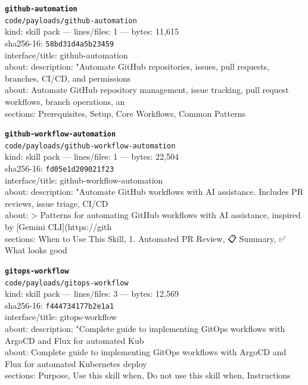 \noindent\textbf{\texttt{github-automation}}\\
\texttt{code/payloads/github-automation}\\
kind: skill pack --- lines/files: 1 --- bytes: 11,615\\
sha256-16: \texttt{58bd31d4a5b23459}\\
interface/title: github-automation\\
about: description: "Automate GitHub repositories, issues, pull requests, branches, CI/CD, and permissions \\
about: Automate GitHub repository management, issue tracking, pull request workflows, branch operations, an\\
sections: Prerequisites, Setup, Core Workflows, Common Patterns\\
\vspace*{6.0pt}

\noindent\textbf{\texttt{github-workflow-automation}}\\
\texttt{code/payloads/github-workflow-automation}\\
kind: skill pack --- lines/files: 1 --- bytes: 22,504\\
sha256-16: \texttt{fd05e1d209021f23}\\
interface/title: github-workflow-automation\\
about: description: "Automate GitHub workflows with AI assistance. Includes PR reviews, issue triage, CI/CD\\
about: > Patterns for automating GitHub workflows with AI assistance, inspired by [Gemini CLI](https://gith\\
sections: When to Use This Skill, 1. Automated PR Review, 📋 Summary, ✅ What looks good\\
\vspace*{6.0pt}
\newpage

\noindent\textbf{\texttt{gitops-workflow}}\\
\texttt{code/payloads/gitops-workflow}\\
kind: skill pack --- lines/files: 3 --- bytes: 12,569\\
sha256-16: \texttt{f444734177b2e1a1}\\
interface/title: gitops-workflow\\
about: description: "Complete guide to implementing GitOps workflows with ArgoCD and Flux for automated Kub\\
about: Complete guide to implementing GitOps workflows with ArgoCD and Flux for automated Kubernetes deploy\\
sections: Purpose, Use this skill when, Do not use this skill when, Instructions\\
\vspace*{6.0pt}

